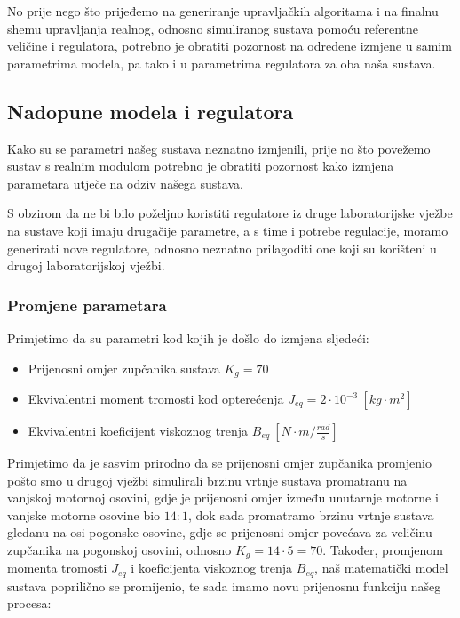 \documentclass[12pt,a4paper]{article}
\begin{document}
No prije nego što prijeđemo na generiranje upravljačkih algoritama i na finalnu shemu upravljanja realnog, odnosno simuliranog sustava pomoću referentne veličine i regulatora, potrebno je obratiti pozornost na određene izmjene u samim parametrima modela, pa tako i u parametrima regulatora za oba naša sustava.

\subsection{Nadopune modela i regulatora}

Kako su se parametri našeg sustava neznatno izmjenili, prije no što povežemo sustav s realnim modulom potrebno je obratiti pozornost kako izmjena parametara utječe na odziv našega sustava.

S obzirom da ne bi bilo poželjno koristiti regulatore iz druge laboratorijske vježbe na sustave koji imaju drugačije parametre, a s time i potrebe regulacije, moramo generirati nove regulatore, odnosno neznatno prilagoditi one koji su korišteni u drugoj laboratorijskoj vježbi.

\subsubsection{Promjene parametara}
Primjetimo da su parametri kod kojih je došlo do izmjena sljedeći:


\begin{itemize}
  \item Prijenosni omjer zupčanika sustava $K_g = 70$
  \item Ekvivalentni moment tromosti kod opterećenja $J_{eq} = 2\cdot10^{-3} \: [kg\cdot m^2]$ 
  \item Ekvivalentni koeficijent viskoznog trenja $B_{eq}  \:  [N\cdot m / \frac{rad}{s}]$
\end{itemize}

Primjetimo da je sasvim prirodno da se prijenosni omjer zupčanika promjenio pošto smo u drugoj vježbi simulirali brzinu vrtnje sustava promatranu na vanjskoj motornoj osovini, gdje je prijenosni omjer između unutarnje motorne i vanjske motorne osovine bio $14:1$, dok sada promatramo brzinu vrtnje sustava gledanu na osi pogonske osovine, gdje se prijenosni omjer povećava za veličinu zupčanika na pogonskoj osovini, odnosno $K_g = 14\cdot 5= 70$. Također, promjenom momenta tromosti $J_{eq}$ i koeficijenta viskoznog trenja $B_{eq}$, naš matematički model sustava poprilično se promijenio, te sada imamo novu prijenosnu funkciju našeg procesa:
\end{document}
